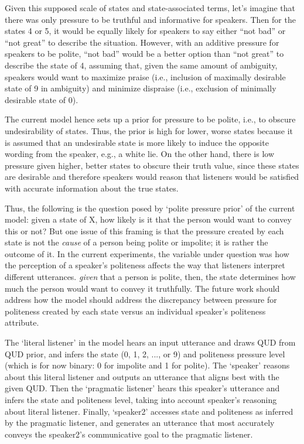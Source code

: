 \documentclass[10pt,letterpaper]{article}
\begin{document}
Given this supposed scale of states and state-associated terms, let's imagine that there was only pressure to be truthful and informative for speakers. Then for the states 4 or 5, it would be equally likely for speakers to say either ``not bad'' or ``not great'' to describe the situation. However, with an additive pressure for speakers to be polite, ``not bad'' would be a better option than ``not great'' to describe the state of 4, assuming that, given the same amount of ambiguity, speakers would want to maximize praise (i.e., inclusion of maximally desirable state of 9 in ambiguity) and minimize dispraise (i.e., exclusion of minimally desirable state of 0). 

The current model hence sets up a prior for pressure to be polite, i.e., to obscure undesirability of states. Thus, the prior is high for lower, worse states because it is assumed that an undesirable state is more likely to induce the opposite wording from the speaker, e.g., a white lie. On the other hand, there is low pressure given higher, better states to obscure their truth value, since these states are desirable and therefore speakers would reason that listeners would be satisfied with accurate information about the true states.

Thus, the following is the question posed by `polite pressure prior' of the current model: given a state of X, how likely is it that the person would want to convey this or not? But one issue of this framing is that the pressure created by each state is not the \emph{cause} of a person being polite or impolite; it is rather the outcome of it. In the current experiments, the variable under question was how the perception of a speaker's politeness affects the way that listeners interpret different utterances. \emph{given} that a person is polite, then, the state determines how much the person would want to convey it truthfully. The future work should address how the model should address the discrepancy between pressure for politeness created by each state versus an individual speaker's politeness attribute.

The `literal listener' in the model hears an input utterance and draws QUD from QUD prior, and infers the state (0, 1, 2, ..., or 9) and politeness pressure level (which is for now binary: 0 for impolite and 1 for polite). The `speaker' reasons about this literal listener and outputs an utterance that aligns best with the given QUD. Then the `pragmatic listener' hears this speaker's utterance and infers the state and politeness level, taking into account speaker's reasoning about literal listener. Finally, `speaker2' accesses state and politeness as inferred by the pragmatic listener, and generates an utterance that most accurately conveys the speaker2's communicative goal to the pragmatic listener. 
\end{document}
